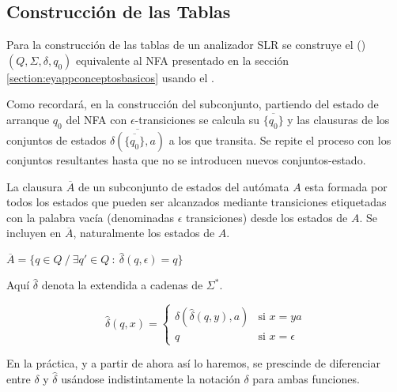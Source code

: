 \subsection{Construcción de las Tablas}
\label{subsection:eyappnfa2dfa}

Para la construcción de las tablas de un analizador SLR
se construye el  () 
$(Q, \Sigma, \delta, q_0)$ equivalente al NFA 
presentado en la sección
\ref{section:eyappconceptosbasicos}
usando el .

Como recordará, en la construcción del subconjunto,
partiendo del estado de arranque $q_0$ del NFA con $\epsilon$-transiciones
se calcula su  $\overline{\{q_0\}}$ y las 
clausuras de los conjuntos de estados $\overline{\delta(\overline{\{q_0\}},a)}$ 
a los que transita.  Se repite el proceso
con los conjuntos resultantes hasta que no se introducen nuevos
conjuntos-estado.


La clausura $\overline{A}$ de un subconjunto de estados del autómata $A$ esta formada
por todos los estados que pueden ser alcanzados mediante transiciones
etiquetadas con la palabra vacía (denominadas $\epsilon$ transiciones)
desde los estados de $A$. Se incluyen en $\overline{A}$, naturalmente los estados 
de $A$.

\begin{center}
$\overline{A} = \{ q \in Q\ /\  \exists q' \in Q\ :\ \hat{\delta}(q, \epsilon) = q \}$
\end{center}

Aquí $\hat{\delta}$ denota la  extendida  a cadenas
de $\Sigma^*$.

\begin{equation}
\label{equation:eyappdeltahat}
\hat{\delta}(q, x) = \left \{ \begin{array}{ll}
                         \delta(\hat{\delta}(q,y),a) & \mbox{si $x = ya$} \\
                         q & \mbox{si $x = \epsilon$} 
                      \end{array}
             \right.  
\end{equation}

En la práctica, y a partir de ahora así lo haremos, se prescinde de diferenciar
entre $\delta$ y $\hat{\delta}$ usándose indistintamente la notación
$\delta$ para ambas funciones.

